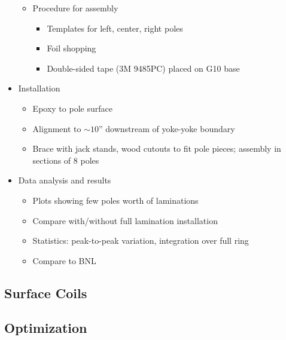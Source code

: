 \begin{itemize}
\begin{itemize}
\begin{itemize}
                  \end{itemize}   
            \item Procedure for assembly
                  \begin{itemize}
                     \item Templates for left, center, right poles 
		     \item Foil shopping
                     \item Double-sided tape (3M 9485PC) placed on G10 base
                  \end{itemize}
         \end{itemize} 
   \item Installation 
         \begin{itemize}
            \item Epoxy to pole surface 
            \item Alignment to $\sim 10$'' downstream of yoke-yoke boundary  
            \item Brace with jack stands, wood cutouts to fit pole pieces; assembly in sections of 8 poles   
         \end{itemize} 
   \item Data analysis and results   
         \begin{itemize}  
            \item Plots showing few poles worth of laminations 
            \item Compare with/without full lamination installation
            \item Statistics: peak-to-peak variation, integration over full ring 
            \item Compare to BNL   
         \end{itemize} 
\end{itemize} 

\subsection{Surface Coils}

\subsection{Optimization}


